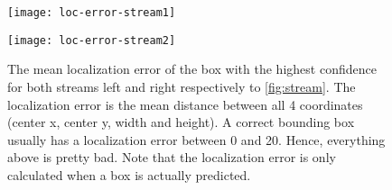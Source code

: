 \documentclass{article}
\begin{document}
\begin{figure}[ht]
	\centering
	\begin{minipage}{0.4\textwidth}
		\centering
		\texttt{[image: loc-error-stream1]}
	\end{minipage}
	\begin{minipage}{0.4\textwidth}
		\centering
		\texttt{[image: loc-error-stream2]}
	\end{minipage}
	\caption{The mean localization error of the box with the highest confidence for both streams left and right respectively to \autoref{fig:stream}. The localization error is the mean distance between all 4 coordinates (center x, center y, width and height). A correct bounding box usually has a localization error between 0 and 20. Hence, everything above is pretty bad. Note that the localization error is only calculated when a box is actually predicted.}
	\label{fig:locerror}
\end{figure}
\end{document}
